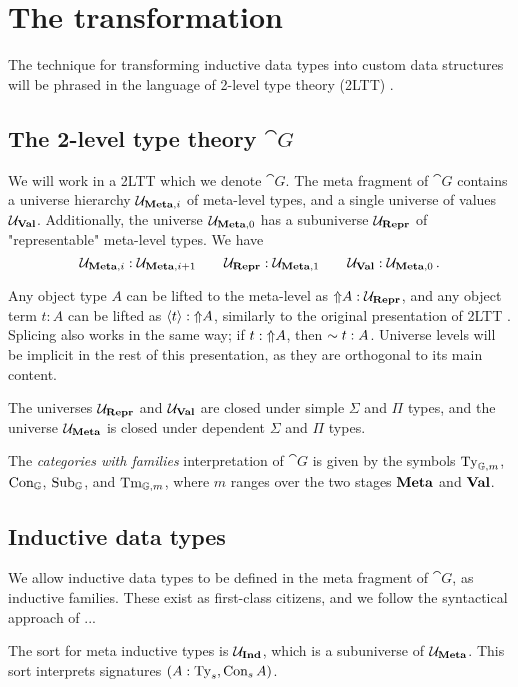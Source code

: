 \section{The transformation}\label{sec:prelim}

The technique for transforming inductive data types into custom data structures
will be phrased in the language of 2-level type theory (2LTT)
\cite{Kovacs2022-vb}.

\subsection{The 2-level type theory $\cat{G}$}

We will work in a 2LTT which we denote $\cat{G}$. The meta fragment of
$\cat{G}$ contains a universe hierarchy ${\mathcal{U}_{{\textbf{Meta},i}}}$ of meta-level
types, and a single universe of values ${{\mathcal{U}_{{\textbf{Val}}}}}$. Additionally, the universe
${\mathcal{U}_{{\textbf{Meta},0}}}$ has a subuniverse ${{\mathcal{U}_{{\textbf{Repr}}}}}$ of "representable" meta-level
types. We have
\[
  {\mathcal{U}_{{\textbf{Meta},i}}} : {\mathcal{U}_{{\textbf{Meta},i+1}}} \qquad {{\mathcal{U}_{{\textbf{Repr}}}}} : {\mathcal{U}_{{\textbf{Meta},1}}} \qquad {{\mathcal{U}_{{\textbf{Val}}}}} : {\mathcal{U}_{{\textbf{Meta},0}}} \,.
\]

Any object type $A$ can be lifted to the meta-level as $\text{$\Uparrow$}{A} : {{\mathcal{U}_{{\textbf{Repr}}}}}$, and any
object term $t : A$ can be lifted as $\langle{t}\rangle : \text{$\Uparrow$}{A}$, similarly to the
original presentation of 2LTT \cite{Kovacs2022-vb}. Splicing also works in the
same way; if $t : \text{$\Uparrow$}{A}$, then $\text{$\sim{t}$} : A$. Universe levels will be
implicit in the rest of this presentation, as they are orthogonal to its main
content.

The universes ${{\mathcal{U}_{{\textbf{Repr}}}}}$ and ${{\mathcal{U}_{{\textbf{Val}}}}}$ are closed under simple $\Sigma$ and $\Pi$ types,
and the universe ${{\mathcal{U}_{{\textbf{Meta}}}}}$ is closed under dependent $\Sigma$ and $\Pi$ types.

The \emph{categories with families} interpretation of $\cat{G}$ is given by the
symbols $\text{Ty}_{\mathbb{G},m}$, $\text{Con}_{\mathbb{G}}$, $\text{Sub}_{\mathbb{G}}$, and
$\text{Tm}_{\mathbb{G},m}$, where $m$ ranges over the two stages $\textbf{Meta}$ and
$\textbf{Val}$.

\subsection{Inductive data types}

We allow inductive data types to be defined in the meta fragment of $\cat{G}$,
as inductive families. These exist as first-class citizens, and we follow the
syntactical approach of \cite{Kaposi2020-is} ...

The sort for meta inductive types is ${{\mathcal{U}_{{\textbf{Ind}}}}}$, which is a subuniverse of ${{\mathcal{U}_{{\textbf{Meta}}}}}$.
This sort interprets signatures $(A : \text{Ty}_s, \text{Con}_s \, A)$.

